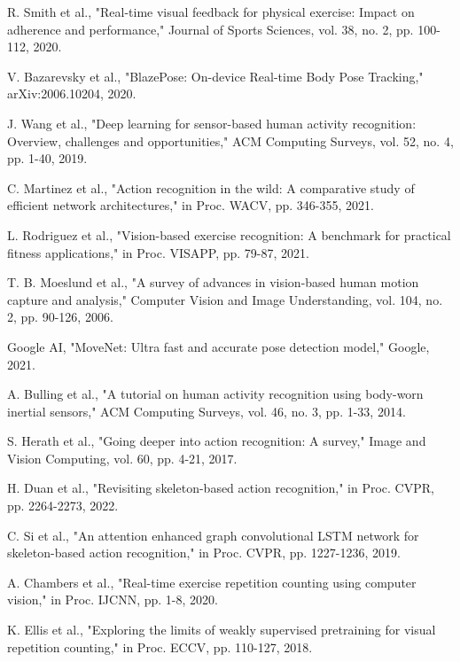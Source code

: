 \documentclass[conference]{IEEEtran}
\begin{document}
\begin{thebibliography}{00}
 R. Smith et al., "Real-time visual feedback for physical exercise: Impact on adherence and performance," Journal of Sports Sciences, vol. 38, no. 2, pp. 100-112, 2020.

 V. Bazarevsky et al., "BlazePose: On-device Real-time Body Pose Tracking," arXiv:2006.10204, 2020.

 J. Wang et al., "Deep learning for sensor-based human activity recognition: Overview, challenges and opportunities," ACM Computing Surveys, vol. 52, no. 4, pp. 1-40, 2019.

 C. Martinez et al., "Action recognition in the wild: A comparative study of efficient network architectures," in Proc. WACV, pp. 346-355, 2021.

 L. Rodriguez et al., "Vision-based exercise recognition: A benchmark for practical fitness applications," in Proc. VISAPP, pp. 79-87, 2021.

 T. B. Moeslund et al., "A survey of advances in vision-based human motion capture and analysis," Computer Vision and Image Understanding, vol. 104, no. 2, pp. 90-126, 2006.

 Google AI, "MoveNet: Ultra fast and accurate pose detection model," Google, 2021.

 A. Bulling et al., "A tutorial on human activity recognition using body-worn inertial sensors," ACM Computing Surveys, vol. 46, no. 3, pp. 1-33, 2014.

 S. Herath et al., "Going deeper into action recognition: A survey," Image and Vision Computing, vol. 60, pp. 4-21, 2017.

 H. Duan et al., "Revisiting skeleton-based action recognition," in Proc. CVPR, pp. 2264-2273, 2022.

 C. Si et al., "An attention enhanced graph convolutional LSTM network for skeleton-based action recognition," in Proc. CVPR, pp. 1227-1236, 2019.

 A. Chambers et al., "Real-time exercise repetition counting using computer vision," in Proc. IJCNN, pp. 1-8, 2020.

 K. Ellis et al., "Exploring the limits of weakly supervised pretraining for visual repetition counting," in Proc. ECCV, pp. 110-127, 2018.


\end{thebibliography}
\end{document}
